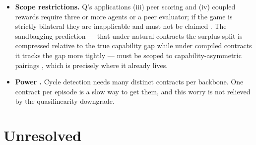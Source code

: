 \documentclass{article}
\begin{document}
\begin{itemize}
\item \textbf{Scope restrictions.} Q's applications (iii) peer scoring and (iv) coupled rewards require three or more agents or a peer evaluator; if the game is strictly bilateral they are inapplicable and must not be claimed . The sandbagging prediction  --- that under natural contracts the surplus split is compressed relative to the true capability gap while under compiled contracts it tracks the gap more tightly --- must be scoped to capability-asymmetric pairings , which is precisely where it already lives.

\item \textbf{Power .} Cycle detection needs many distinct contracts per backbone. One contract per episode is a slow way to get them, and this worry is not relieved by the quasilinearity downgrade.
\end{itemize}

\section{Unresolved}
\end{document}
